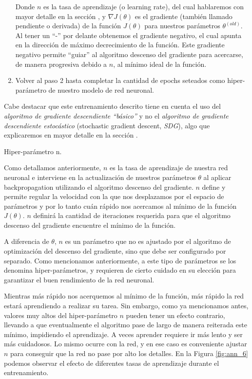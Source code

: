 \documentclass[12pt,a4paper]{article}
\makeatletter
\renewcommand\paragraph{\@startsection{paragraph}{4}{\z@}
            {-2.5ex\@plus -1ex \@minus -.25ex}
            {1.25ex \@plus .25ex}
            {\normalfont\normalsize\bfseries}}
\makeatother
\begin{document}
\begin{sloppypar}
\begin{enumerate}
Donde $n$ es la tasa de aprendizaje (o learning rate), del cual hablaremos con mayor detalle en la sección \textit{}, y $\nabla J(\theta)$ es el gradiente (también llamado pendiente o derivada) de la función $J(\theta)$ para nuestros parámetros $\theta^{(old)}$. Al tener un “-” por delante obtenemos el gradiente negativo, el cual apunta en la dirección de máximo decrecimiento de la función. Este gradiente negativo permite “guiar” al algoritmo descenso del gradiente para acercarse, de manera progresiva debido a $n$, al mínimo ideal de la función.      

\item Volver al paso 2 hasta completar la cantidad de epochs seteados como hiper-parámetro de nuestro modelo de red neuronal. 

\end{enumerate}

Cabe destacar que este entrenamiento descrito tiene en cuenta el uso del \textit{algoritmo de gradiente descendiente “básico”} y no el \textit{algoritmo de gradiente descendiente estocástico} (stochastic gradient descent, \textit{SDG}), algo que explicaremos en mayor detalle en la sección \textit{}.

\paragraph{Hiper-parámetro n.}\label{hiper_n}

Como detallamos anteriormente, $n$ es la tasa de aprendizaje de nuestra red neuronal e interviene en la actualización de nuestros parámetros  $\theta$ al aplicar backpropagation utilizando el algoritmo descenso del gradiente. $n$ define y permite regular la velocidad con la que nos desplazamos por el espacio de parámetros y por lo tanto cuán rápido nos acercamos al mínimo de la función $J(\theta)$. $n$ definirá la cantidad de iteraciones requerida para que el algoritmo descenso del gradiente encuentre el mínimo de la función.

A diferencia de $\theta$, $n$ es un parámetro que no es ajustado por el algoritmo de optimización del descenso del gradiente, sino que debe ser configurado por separado. Como mencionamos anteriormente, a este tipo de parámetros se los denomina hiper-parámetros, y requieren de cierto cuidado en su elección para garantizar el buen rendimiento de la red neuronal. 

Mientras más rápido nos acerquemos al mínimo de la función, más rápido la red estará aprendiendo a realizar su tarea. Sin embargo, como ya mencionamos antes, valores muy altos del hiper-parámetro $n$ pueden tener un efecto contrario, llevando a que eventualmente el algoritmo pase de largo de manera reiterada este mínimo, impidiendo el aprendizaje. A veces aprender requiere ir más lento y ser más cuidadosos. Lo mismo ocurre con la red, y en ese caso es conveniente ajustar $n$ para conseguir que la red no pase por alto los detalles. En la Figura \ref{fig:ann_6} podemos observar el efecto de diferentes tasas de aprendizaje durante el entrenamiento. 


\end{sloppypar}
\end{document}
